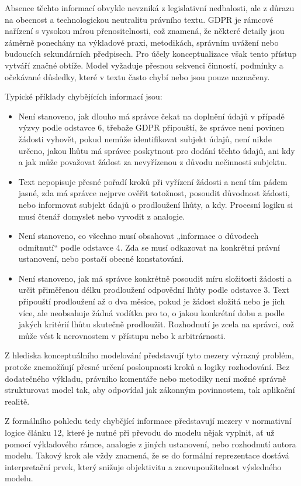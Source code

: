 Absence těchto informací obvykle nevzniká z legislativní nedbalosti, ale z důrazu na obecnost a technologickou neutralitu právního textu. GDPR je rámcové nařízení s vysokou mírou přenositelnosti, což znamená, že některé detaily jsou záměrně ponechány na výkladové praxi, metodikách, správním uvážení nebo budoucích sekundárních předpisech. Pro účely konceptualizace však tento přístup vytváří značné obtíže. Model vyžaduje přesnou sekvenci činností, podmínky a očekávané důsledky, které v textu často chybí nebo jsou pouze naznačeny.

Typické příklady chybějících informací jsou:
\begin{itemize}
  \item Není stanoveno, jak dlouho má správce čekat na doplnění údajů v případě výzvy podle odstavce 6, třebaže GDPR připouští, že správce není povinen žádosti vyhovět, pokud nemůže identifikovat subjekt údajů, není nikde určeno, jakou lhůtu má správce poskytnout pro dodání těchto údajů, ani kdy a jak může považovat žádost za nevyřízenou z důvodu nečinnosti subjektu.
  \item Text nepopisuje přesné pořadí kroků při vyřízení žádosti a není tím pádem jasné, zda má správce nejprve ověřit totožnost, posoudit důvodnost žádosti, nebo informovat subjekt údajů o prodloužení lhůty, a kdy. Procesní logiku si musí čtenář domyslet nebo vyvodit z analogie.
  \item Není stanoveno, co všechno musí obsahovat „informace o důvodech odmítnutí“ podle odstavce 4. Zda se musí odkazovat na konkrétní právní ustanovení, nebo postačí obecné konstatování.
  \item Není stanoveno, jak má správce konkrétně posoudit míru složitosti žádosti a určit přiměřenou délku prodloužení odpovědní lhůty podle odstavce 3. Text připouští prodloužení až o dva měsíce, pokud je žádost složitá nebo je jich více, ale neobsahuje žádná vodítka pro to, o jakou konkrétní dobu a podle jakých kritérií lhůtu skutečně prodloužit. Rozhodnutí je zcela na správci, což může vést k nerovnostem v přístupu nebo k arbitrárnosti.
\end{itemize}
  
\noindent Z hlediska konceptuálního modelování představují tyto mezery výrazný problém, protože znemožňují přesné určení posloupnosti kroků a logiky rozhodování. Bez dodatečného výkladu, právního komentáře nebo metodiky není možné správně strukturovat model tak, aby odpovídal jak zákonným povinnostem, tak aplikační realitě.

Z formálního pohledu tedy chybějící informace představují mezery v normativní logice článku 12, které je nutné při převodu do modelu nějak vyplnit, ať už pomocí výkladového rámce, analogie z jiných ustanovení, nebo rozhodnutí autora modelu. Takový krok ale vždy znamená, že se do formální reprezentace dostává interpretační prvek, který snižuje objektivitu a znovupoužitelnost výsledného modelu.


